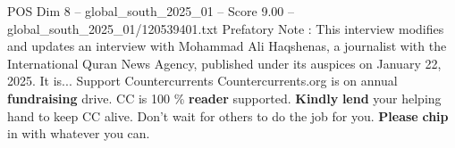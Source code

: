 \begin{textsample}{POS Dim 8 – global\_south\_2025\_01 – Score 9.00 – global\_south\_2025\_01/120539401.txt}
Prefatory Note : This interview modifies and updates an interview with Mohammad Ali Haqshenas, a journalist with the International Quran News Agency, published under its auspices on January 22, 2025.
It is...
Support Countercurrents Countercurrents.org is on annual \textbf{fundraising} drive.
CC is 100 \% \textbf{reader} supported. \textbf{Kindly} \textbf{lend} your helping hand to keep CC alive.
Don't wait for others to do the job for you. \textbf{Please} \textbf{chip} in with whatever you can.

\end{textsample}

